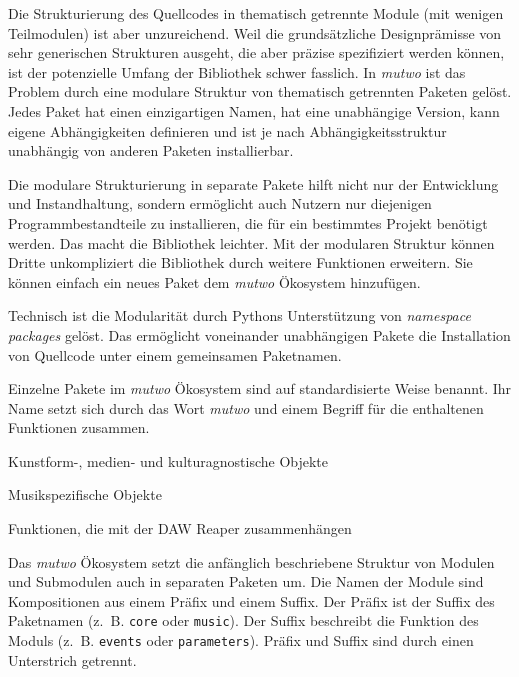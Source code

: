 \documentclass[12pt,a4paper,ngerman]{article}
\begin{document}
Die Strukturierung des Quellcodes in thematisch getrennte Module (mit wenigen Teilmodulen) ist aber unzureichend.
Weil die grundsätzliche Designprämisse von sehr generischen Strukturen ausgeht, die aber präzise spezifiziert werden können, ist der potenzielle Umfang der Bibliothek schwer fasslich.
In \emph{mutwo} ist das Problem durch eine modulare Struktur von thematisch getrennten Paketen gelöst.
Jedes Paket hat einen einzigartigen Namen, hat eine unabhängige Version, kann eigene Abhängigkeiten definieren und ist je nach Abhängigkeitsstruktur unabhängig von anderen Paketen installierbar.

\bigskip

Die modulare Strukturierung in separate Pakete hilft nicht nur der Entwicklung und Instandhaltung, sondern ermöglicht auch Nutzern nur diejenigen Programmbestandteile zu installieren, die für ein bestimmtes Projekt benötigt werden.
Das macht die Bibliothek leichter.
Mit der modularen Struktur können Dritte unkompliziert die Bibliothek durch weitere Funktionen erweitern.
Sie können einfach ein neues Paket dem \emph{mutwo} Ökosystem hinzufügen.

\bigskip

Technisch ist die Modularität durch Pythons Unterstützung von \emph{namespace packages} gelöst.
Das ermöglicht voneinander unabhängigen Pakete die Installation von Quellcode unter einem gemeinsamen Paketnamen.

\bigskip

Einzelne Pakete im \emph{mutwo} Ökosystem sind auf standardisierte Weise benannt.
Ihr Name setzt sich durch das Wort \emph{mutwo} und einem Begriff für die enthaltenen Funktionen zusammen.

\bigskip

\hspace{0.5cm}
\begin{minipage}{0.95\textwidth}
    \begin{description}[style=multiline, leftmargin=3.25cm, font=\normalfont\emph]
        \item[mutwo.core] Kunstform-, medien- und kulturagnostische Objekte
        \item[mutwo.music] Musikspezifische Objekte
        \item[mutwo.reaper] Funktionen, die mit der DAW Reaper zusammenhängen
    \end{description}
\end{minipage}

\bigskip

Das \emph{mutwo} Ökosystem setzt die anfänglich beschriebene Struktur von Modulen und Submodulen auch in separaten Paketen um.
Die Namen der Module sind Kompositionen aus einem Präfix und einem Suffix.
Der Präfix ist der Suffix des Paketnamen (z.~B. \texttt{core} oder \texttt{music}).
Der Suffix beschreibt die Funktion des Moduls (z.~B. \texttt{events} oder \texttt{parameters}).
Präfix und Suffix sind durch einen Unterstrich getrennt.
\end{document}
